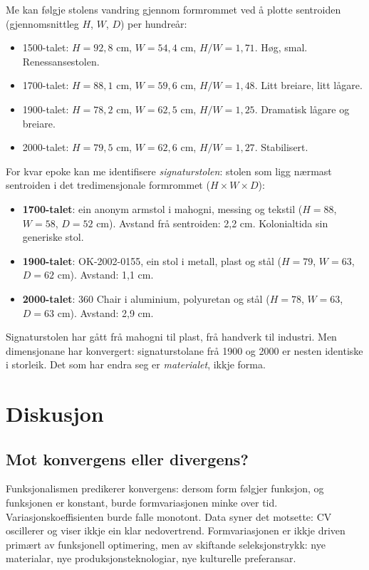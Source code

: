 \documentclass[10pt, a4paper, twocolumn]{article}
\begin{document}
Me kan følgje stolens vandring gjennom formrommet ved å plotte sentroiden (gjennomsnittleg $H$, $W$, $D$) per hundreår:

\begin{itemize}
  \item 1500-talet: $H = 92{,}8$ cm, $W = 54{,}4$ cm, $H/W = 1{,}71$. Høg, smal. Renessansestolen.
  \item 1700-talet: $H = 88{,}1$ cm, $W = 59{,}6$ cm, $H/W = 1{,}48$. Litt breiare, litt lågare.
  \item 1900-talet: $H = 78{,}2$ cm, $W = 62{,}5$ cm, $H/W = 1{,}25$. Dramatisk lågare og breiare.
  \item 2000-talet: $H = 79{,}5$ cm, $W = 62{,}6$ cm, $H/W = 1{,}27$. Stabilisert.
\end{itemize}

For kvar epoke kan me identifisere \emph{signaturstolen}: stolen som ligg nærmast sentroiden i det tredimensjonale formrommet ($H \times W \times D$):

\begin{itemize}
  \item \textbf{1700-talet}: ein anonym armstol i mahogni, messing og tekstil ($H = 88$, $W = 58$, $D = 52$ cm). Avstand frå sentroiden: 2,2 cm. Kolonialtida sin generiske stol.
  \item \textbf{1900-talet}: OK-2002-0155, ein stol i metall, plast og stål ($H = 79$, $W = 63$, $D = 62$ cm). Avstand: 1,1 cm.
  \item \textbf{2000-talet}: 360 Chair i aluminium, polyuretan og stål ($H = 78$, $W = 63$, $D = 63$ cm). Avstand: 2,9 cm.
\end{itemize}

Signaturstolen har gått frå mahogni til plast, frå handverk til industri. Men dimensjonane har konvergert: signaturstolane frå 1900 og 2000 er nesten identiske i storleik. Det som har endra seg er \emph{materialet}, ikkje forma.


\section{Diskusjon}

\subsection{Mot konvergens eller divergens?}

Funksjonalismen predikerer konvergens: dersom form følgjer funksjon, og funksjonen er konstant, burde formvariasjonen minke over tid. Variasjonskoeffisienten burde falle monotont. Data syner det motsette: CV oscillerer og viser ikkje ein klar nedovertrend. Formvariasjonen er ikkje driven primært av funksjonell optimering, men av skiftande seleksjonstrykk: nye materialar, nye produksjonsteknologiar, nye kulturelle preferansar.
\end{document}
